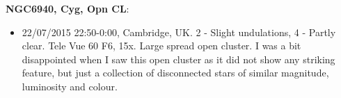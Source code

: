 {\bf NGC6940, Cyg, Opn CL}:
\begin{itemize}
\item 22/07/2015 22:50-0:00, Cambridge, UK. 2 - Slight undulations, 4 - Partly clear. Tele Vue 60 F6, 15x. Large spread open cluster. I was a bit disappointed when I saw this open cluster as it did not show any striking feature, but just a collection of disconnected stars of similar magnitude, luminosity and colour. 
\end{itemize}
